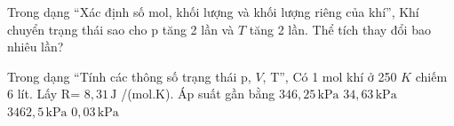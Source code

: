 \begin{ex}
Trong dạng “Xác định số mol, khối lượng và khối lượng riêng của khí”, Khí chuyển trạng thái sao cho p tăng 2 lần và $T$ tăng 2 lần. Thể tích thay đổi bao nhiêu lần?
\end{ex}

\begin{ex}
Trong dạng “Tính các thông số trạng thái p, $V$, T”, Có 1 mol khí ở 250 $K$ chiếm 6 lít. Lấy R= $8,31\,\text{J}$ /(mol.K). Áp suất gần bằng
\choice
{\True $346,25\,\text{kPa}$}
{$34,63\,\text{kPa}$}
{$3462,5\,\text{kPa}$}
{$0,03\,\text{kPa}$}
\end{ex}

